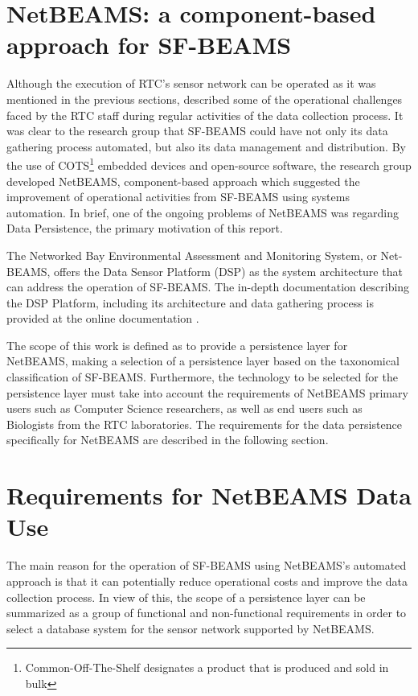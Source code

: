 \section{NetBEAMS: a component-based approach for SF-BEAMS}
\label{sec:problem-requirements}

Although the execution of RTC's sensor network can be operated as it
was mentioned in the previous sections, \cite{netbeams2009} described some of the
operational challenges faced by the RTC staff during regular activities of the
data collection process. It was clear to the research group that SF-BEAMS
could have not only its data gathering process automated, but also its data
management and distribution. By the use of COTS\footnote{Common-Off-The-Shelf
designates a product that is produced and sold in bulk} embedded devices and
open-source \cite{open-source} software, the research group developed NetBEAMS,
component-based approach which suggested the improvement of operational
activities from SF-BEAMS using systems automation. In brief, one of the
ongoing problems of NetBEAMS was regarding Data Persistence, the primary
motivation of this report.

The Networked Bay Environmental Assessment and Monitoring System, or Net-BEAMS,
offers the Data Sensor Platform (DSP) \cite{netbeams2009} as the system
architecture that can address the operation of SF-BEAMS. The in-depth
documentation describing the DSP Platform, including its architecture and data
gathering process is provided at the online documentation 
\cite{netbeams-dsp-architecture}.

The scope of this work is defined as to provide a persistence layer for
NetBEAMS, making a selection of a persistence layer based on the taxonomical
classification of SF-BEAMS. Furthermore, the technology to be selected for the
persistence layer must take into account the requirements of NetBEAMS primary
users such as Computer Science researchers, as well as end users such as
Biologists from the RTC laboratories. The requirements for the data
persistence specifically for NetBEAMS are described in the following section.

\section{Requirements for NetBEAMS Data Use}

The main reason for the operation of SF-BEAMS using NetBEAMS's automated
approach is that it can potentially reduce operational costs and improve the
data collection process. In view of this, the scope of a persistence layer
can be summarized as a group of functional and non-functional requirements in
order to select a database system for the sensor network supported by NetBEAMS.

